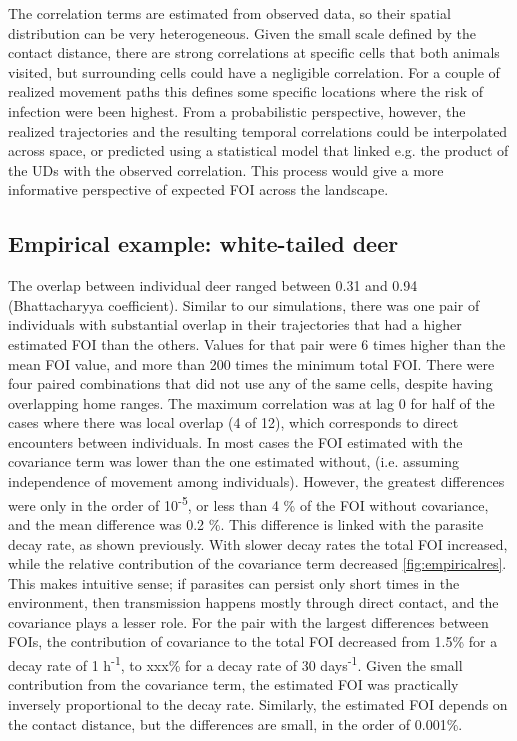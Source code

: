 \documentclass[letterpaper]{article}
\begin{document}
The correlation terms are estimated from observed data, so their spatial distribution can be very heterogeneous. Given the small scale defined by the contact distance, there are strong correlations at  specific cells that both animals visited, but surrounding cells could have a negligible correlation. 
For a couple of realized movement paths this defines some specific locations where the risk of infection were been highest. From a probabilistic perspective, however, the realized trajectories and the resulting temporal correlations could be interpolated across space, or predicted using a statistical model that linked e.g. the product of the UDs with the observed correlation. This process would give a more informative perspective of expected FOI across the landscape. 


\subsection*{Empirical example: white-tailed deer}
The overlap between individual deer ranged between 0.31 and 0.94 (Bhattacharyya coefficient). 
Similar to our simulations, there was one pair of individuals with substantial overlap in their trajectories that had a higher estimated FOI than the others. Values for that pair were 6 times higher than the mean FOI value, and more than 200 times the minimum total FOI. 
There were four paired combinations that did not use any of the same cells, despite having overlapping home ranges. %
The maximum correlation was at lag 0 for half of the cases where there was local overlap (4 of 12), which corresponds to direct encounters between individuals.
In most cases the FOI estimated with the covariance term was lower than the one estimated without, (i.e. assuming independence of movement among individuals). However, the greatest differences were only in the order of 10\textsuperscript{-5}, or less than 4 \% of the FOI without covariance, and the mean difference was 0.2 \%.
This difference is linked with the parasite decay rate, as shown previously. With slower decay rates the total FOI increased, while the relative contribution of the covariance term decreased \ref{fig:empiricalres}. 
This makes intuitive sense; if parasites can persist only short times in the environment, then transmission happens mostly through direct contact, and the covariance plays a lesser role. 
For the pair with the largest differences between FOIs, the contribution of covariance to the total FOI decreased from 1.5\% for a decay rate of 1 h\textsuperscript{-1}, to xxx\% for a decay rate of 30 days\textsuperscript{-1}.
Given the small contribution from the covariance term, the estimated FOI was practically inversely proportional to the decay rate. 
Similarly, the estimated FOI depends on the contact distance, but the differences are small, in the order of 0.001\%. 
\end{document}
